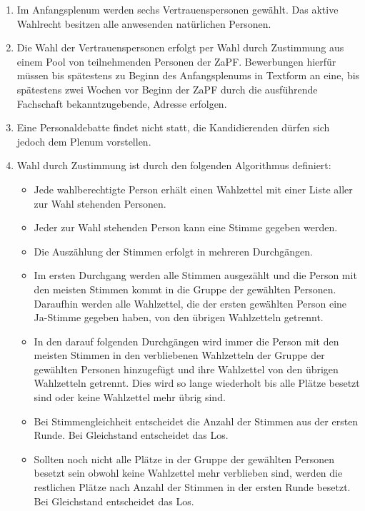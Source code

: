 \documentclass[12pt,oneside]{scrartcl}
\begin{document}
\begin{enumerate}
\item Im Anfangsplenum werden sechs Vertrauenspersonen gewählt. Das aktive
Wahlrecht besitzen alle anwesenden natürlichen Personen.

\item Die Wahl der Vertrauenspersonen erfolgt per Wahl durch
Zustimmung aus einem Pool von teilnehmenden Personen der ZaPF.
Bewerbungen hierfür müssen bis spätestens zu Beginn des Anfangsplenums
in Textform an eine, bis spätestens zwei Wochen vor Beginn der
ZaPF durch die ausführende Fachschaft bekanntzugebende, Adresse erfolgen.

\item Eine Personaldebatte findet nicht statt, die Kandidierenden dürfen sich
jedoch dem Plenum vorstellen.

\item Wahl durch Zustimmung ist durch den folgenden Algorithmus definiert:

\begin{itemize}
\item Jede wahlberechtigte Person erhält einen Wahlzettel mit einer
Liste aller zur Wahl stehenden Personen.

\item Jeder zur Wahl stehenden Person kann eine Stimme gegeben werden.

\item Die Auszählung der Stimmen erfolgt in mehreren Durchgängen.

\item Im ersten Durchgang werden alle Stimmen ausgezählt und die Person
mit den meisten Stimmen kommt in die Gruppe der gewählten Personen.
Daraufhin werden alle Wahlzettel, die der ersten gewählten Person
eine Ja-Stimme gegeben haben, von den übrigen Wahlzetteln getrennt.

\item In den darauf folgenden Durchgängen wird immer die Person mit den
meisten Stimmen in den verbliebenen Wahlzetteln der Gruppe der gewählten
Personen hinzugefügt und ihre Wahlzettel von den übrigen Wahlzetteln
getrennt. Dies wird so lange wiederholt bis alle Plätze besetzt sind
oder keine Wahlzettel mehr übrig sind.

\item Bei Stimmengleichheit entscheidet die Anzahl der Stimmen aus der
ersten Runde. Bei Gleichstand entscheidet das Los.

\item Sollten noch nicht alle Plätze in der Gruppe der gewählten Personen
besetzt sein obwohl keine Wahlzettel mehr verblieben sind, werden
die restlichen Plätze nach Anzahl der Stimmen in der ersten Runde
besetzt. Bei Gleichstand entscheidet das Los.
\end{itemize}


\end{enumerate}
\end{document}
